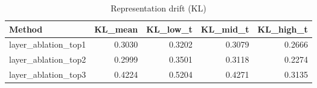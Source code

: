 \begin{table}[htbp]
\centering
\caption{Representation drift (KL)}
\label{tab:repr-drift}
\begin{tabular}{lrrrr}
\toprule
\textbf{Method} & \textbf{KL\_mean} & \textbf{KL\_low\_t} & \textbf{KL\_mid\_t} & \textbf{KL\_high\_t} \\
\midrule
layer\_ablation\_top1 & 0.3030 & 0.3202 & 0.3079 & 0.2666 \\
layer\_ablation\_top2 & 0.2999 & 0.3501 & 0.3118 & 0.2274 \\
layer\_ablation\_top3 & 0.4224 & 0.5204 & 0.4271 & 0.3135 \\
\bottomrule
\end{tabular}
\end{table}
